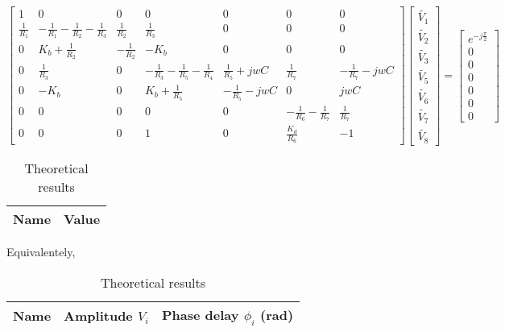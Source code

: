 \begin{equation}
  \begin{bmatrix}
    1 & 0 & 0 & 0 & 0 & 0 & 0 \\
    \frac{1}{R_1} & -\frac{1}{R_1}-\frac{1}{R_2}-\frac{1}{R_3} & \frac{1}{R_2} & \frac{1}{R_3} & 0 & 0 & 0 \\
    0 & K_b + \frac{1}{R_2} & -\frac{1}{R_2} & -K_b & 0 & 0 & 0 \\
    0 & \frac{1}{R_3} & 0 & -\frac{1}{R_3}-\frac{1}{R_5}-\frac{1}{R_4} & \frac{1}{R_5}+jwC & \frac{1}{R_7} & -\frac{1}{R_7}-jwC \\
    0 & -K_b & 0 & K_b+\frac{1}{R_5} & -\frac{1}{R_5}-jwC & 0 & jwC \\
    0 & 0 & 0 & 0 & 0 & -\frac{1}{R_6}-\frac{1}{R_7} & \frac{1}{R_7} \\
    0 & 0 & 0 & 1 & 0 & \frac{K_d}{R_6} & -1     
  \end{bmatrix}
  \begin{bmatrix}
    \widetilde{V_1} \\
    \widetilde{V_2} \\
    \widetilde{V_3} \\
    \widetilde{V_5} \\
    \widetilde{V_6} \\
    \widetilde{V_7} \\
    \widetilde{V_8}
  \end{bmatrix}
  =
  \begin{bmatrix}
    e^{-j\frac{\pi}{2}} \\
    0 \\
    0 \\
    0 \\
    0 \\
    0 \\
    0
  \end{bmatrix}
  \label{pha}
\end{equation}

\begin{table}[H]
  \centering
  \begin{tabular}{|c|c|}
    \hline
        {\bf Name} & {\bf Value} \\
        \hline
        \hline
        
        \hline
  \end{tabular}
  \caption{Theoretical results}
  \label{forced_res}
\end{table}

Equivalentely,

\begin{table}[H]
  \centering
  \begin{tabular}{|c|c|c|}
    \hline
        {\bf Name} & {\bf Amplitude $V_i$} & {\bf Phase delay $\phi_i$ (rad)} \\
        \hline
        \hline
        
        \hline
  \end{tabular}
  \caption{Theoretical results}
  \label{forcedamplitudes_res}
\end{table}

